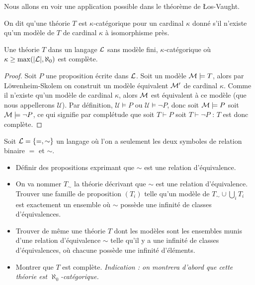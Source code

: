 Nous allons en voir une application possible dans le théorème de Łos-Vaught.

\begin{defi}
    On dit qu'une théorie $T$ est $\kappa$-catégorique pour un cardinal $\kappa$ donné s'il n'existe qu'un modèle de $T$ de cardinal $\kappa$ à isomorphisme près.
\end{defi}

\begin{them}
    Une théorie $T$ dans un langage $\mathcal L$ sans modèle fini, $\kappa$-catégorique où $\kappa \geq \max(|\mathcal L|,\aleph_0)$ est complète.
\end{them}

\begin{proof}
    Soit $P$ une proposition écrite dans $\mathcal L$. Soit un modèle $\mathcal M\models T$, alors par Löwenheim-Skolem on construit un modèle équivalent $\mathcal M'$ de cardinal $\kappa$. Comme il n'existe qu'un modèle de cardinal $\kappa$, alors $\mathcal M$ est équivalent à ce modèle (que nous appellerons $\mathcal U$). Par définition, $\mathcal U\models P$ ou $\mathcal U\models \lnot P$, donc soit $\mathcal M\models P$ soit $\mathcal M\models \lnot P$, ce qui signifie par complétude que soit $T\vdash P$ soit $T\vdash \lnot P$ : $T$ est donc complète.
\end{proof}

\begin{exo}
    Soit $\mathcal L = \{=,\sim\}$ un langage où l'on a seulement les deux symboles de relation binaire $=$ et $\sim$.
    \begin{itemize}[label=$\bullet$]
        \item Définir des propositions exprimant que $\sim$ est une relation d'équivalence.
        \item On va nommer $T_{\sim}$ la théorie décrivant que $\sim$ est une relation d'équivalence. Trouver une famille de proposition $(T_i)$ telle qu'un modèle de $T_{\sim}\cup\bigcup_i T_i$ est exactement un ensemble où $\sim$ possède une infinité de classes d'équivalences.
        \item Trouver de même une théorie $T$ dont les modèles sont les ensembles munis d'une relation d'équivalence $\sim$ telle qu'il y a une infinité de classes d'équivalences, où chacune possède une infinité d'éléments.
        \item Montrer que $T$ est complète. \textit{Indication : on montrera d'abord que cette théorie est $\aleph_0$-catégorique.}
    \end{itemize}
\end{exo}


\newpage
\thispagestyle{empty}